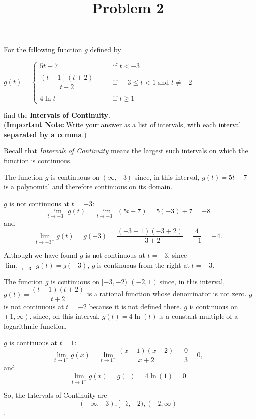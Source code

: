 \documentclass{ximera}
\title[Problem 2]{Problem 2}
\begin{document}
\begin{abstract} \end{abstract}
\maketitle


\begin{problem}
For the following function $g$ defined by
	
	$g(t) =   \left\{ \begin{array}{cl}
	5t + 7		 	&	\qquad \text{if } t < -3					\\ \\
	\dfrac{(t-1)(t+2)}{t+2}	&	\qquad \text{if } -3 \leq t < 1 \text{ and } t \neq -2	\\ \\
	4 \ln t				&	\qquad \text{if } t \geq 1					\end{array} \right.  $

  find the \textbf{Intervals of Continuity}.  \\
  (\textbf{Important Note:} Write your answer as a list of intervals, with each interval \textbf{separated by a comma}.)	

\begin{explanation}	
	Recall that \emph{Intervals of Continuity} means the largest such intervals on which the function is continuous.
	
	The function $g$ is continuous on $(\infty, -3)$ since, in this interval, $g(t)=5t+7$ is a polynomial and therefore continuous on its domain.
  
  $g$ is not continuous at $t = -3$:
  \[
    \lim_{t \to -3^-} g(t) = \lim_{t \to -3^-} (5t+7) = 5(-3) + 7 = -8
  \]
  and
  \[
   \lim_{t \to -3^+} g(t)=g(-3) = \frac{(-3-1)(-3+2)}{-3+2} = \frac{4}{-1} = -4.
  \]

Although we have found $g$ is not continuous at $t = -3$, since $\lim_{t \to -3^+} g(t)=g(-3)$, $g$ is continuous from the right at $t=-3$.


  The function $g$ is continuous on $[-3, -2),(-2,1)$ since, in this interval, $g(t) = \dfrac{(t-1)(t+2)}{t+2}$ is a rational function whose denominator is not zero. $g$ is not continuous at $t=-2$ because it is not defined there.   $g$ is continuous on $(1, \infty)$, since, on this interval, $g(t) =  4 \ln(t)$ is a constant multiple of a  logarithmic function.

$g$ is continuous at $t = 1$:
  \[
    \lim_{t \to 1^-} g(x) = \lim_{t \to 1^-} \frac{(x-1)(x+2)}{x+2} = \frac{0}{3} = 0,
  \]
  and
\[ \lim_{t \to 1^+} g(x)=g(1) = 4 \ln(1) = 0\]


So,  the Intervals of Continuity are \[(-\infty, -3), [-3, -2), (-2, \infty)\].
  \end{explanation}
	
		
	
\end{problem}
\end{document}
